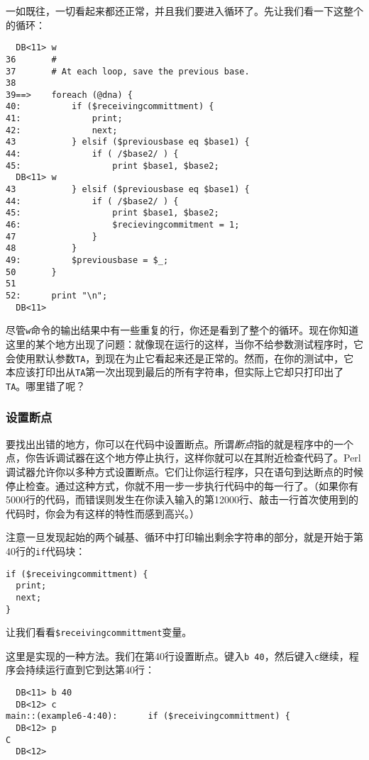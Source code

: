 一如既往，一切看起来都还正常，并且我们要进入循环了。先让我们看一下这整个的循环：

\begin{lstlisting}
  DB<11> w
36       #
37       # At each loop, save the previous base.
38
39==>    foreach (@dna) {
40:          if ($receivingcommittment) {
41:              print;
42:              next;
43           } elsif ($previousbase eq $base1) {
44:              if ( /$base2/ ) {
45:                  print $base1, $base2; 
  DB<11> w
43           } elsif ($previousbase eq $base1) {
44:              if ( /$base2/ ) {
45:                  print $base1, $base2; 
46:                  $recievingcommitment = 1;
47               }
48           }
49:          $previousbase = $_;
50       }
51
52:      print "\n";
  DB<11>
\end{lstlisting}

尽管\verb|w|命令的输出结果中有一些重复的行，你还是看到了整个的循环。现在你知道这里的某个地方出现了问题：就像现在运行的这样，当你不给参数测试程序时，它会使用默认参数\verb|TA|，到现在为止它看起来还是正常的。然而，在你的测试中，它本应该打印出从\verb|TA|第一次出现到最后的所有字符串，但实际上它却只打印出了\verb|TA|。哪里错了呢？

\subsubsection{设置断点}
要找出出错的地方，你可以在代码中设置断点。所谓\textit{断点}指的就是程序中的一个点，你告诉调试器在这个地方停止执行，这样你就可以在其附近检查代码了。Perl调试器允许你以多种方式设置断点。它们让你运行程序，只在语句到达断点的时候停止检查。通过这种方式，你就不用一步一步执行代码中的每一行了。（如果你有5000行的代码，而错误则发生在你读入输入的第12000行、敲击一行首次使用到的代码时，你会为有这样的特性而感到高兴。）

注意一旦发现起始的两个碱基、循环中打印输出剩余字符串的部分，就是开始于第40行的\verb|if|代码块：

\begin{lstlisting}
if ($receivingcommittment) {
  print;
  next;
}
\end{lstlisting}

让我们看看\verb|$receivingcommittment|变量。

这里是实现的一种方法。我们在第40行设置断点。键入\verb|b 40|，然后键入\verb|c|继续，程序会持续运行直到它到达第40行：

\begin{lstlisting}
  DB<11> b 40
  DB<12> c
main::(example6-4:40):      if ($receivingcommittment) {
  DB<12> p
C
  DB<12> 
\end{lstlisting}

